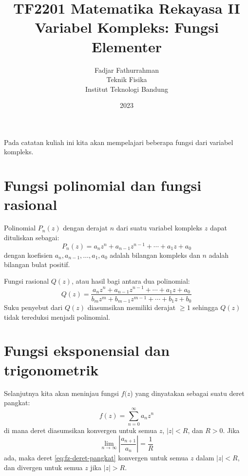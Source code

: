 



\title{%
{\small TF2201 Matematika Rekayasa II}\\
Variabel Kompleks: Fungsi Elementer
}
\author{Fadjar Fathurrahman\\
Teknik Fisika\\
Institut Teknologi Bandung}
\date{2023}
\maketitle

Pada catatan kuliah ini kita akan mempelajari beberapa fungsi dari
variabel kompleks.


\section{Fungsi polinomial dan fungsi rasional}
Polinomial $P_n(z)$ dengan derajat $n$ dari suatu variabel kompleks $z$ dapat
dituliskan sebagai:
\begin{equation}
P_{n}(z) = a_{n}z^{n} + a_{n-1}z^{n-1} + \cdots + a_{1}z + a_{0}
\end{equation}
dengan koefisien $a_{n},a_{n-1},\ldots,a_{1},a_{0}$ adalah bilangan
kompleks dan $n$ adalah bilangan bulat positif.

Fungsi rasional $Q(z)$, atau hasil bagi antara dua polinomial:
\begin{equation}
Q(z) = \frac{a_{n}z^{n} + a_{n-1}z^{n-1} + \cdots + a_{1}z + a_{0}}%
{b_{m}z^{m}+b_{m-1}z^{m-1}+\cdots+b_{1}z+b_{0}}
\end{equation}
Suku penyebut dari $Q(z)$ diasumsikan memiliki derajat $\geq 1$ sehingga
$Q(z)$ tidak tereduksi menjadi polinomial.


\section{Fungsi eksponensial dan trigonometrik}

Selanjutnya kita akan meninjau fungsi $f(z$) yang dinyatakan
sebagai suatu deret pangkat:
\begin{equation}
f(z) = \sum_{n=0}^{\infty} a_{n} z^{n}
\label{eq:fz-deret-pangkat}
\end{equation}
di mana deret diasumsikan konvergen untuk semua $z$, $|z|<R$, dan
$R>0$. Jika
\begin{equation*}
\lim_{n\rightarrow\infty}\left|\frac{a_{n+1}}{a_{n}}\right|=\frac{1}{R}
\end{equation*}
ada, maka deret \ref{eq:fz-deret-pangkat}
konvergen untuk semua $z$ dalam $|z| < R$, dan divergen untuk semua $z$
jika $|z| > R$.

